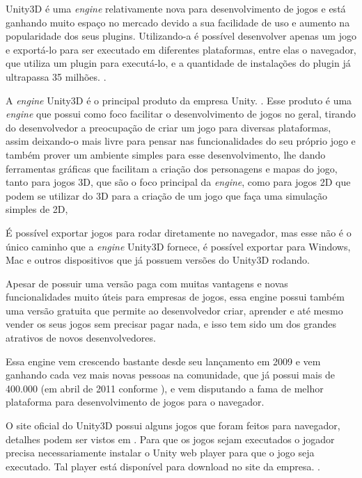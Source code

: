 Unity3D é uma \textit{engine} relativamente nova para desenvolvimento de jogos e está
ganhando muito espaço no mercado devido a sua facilidade de uso e
aumento na popularidade dos seus plugins. Utilizando-a é possível
desenvolver apenas um jogo e exportá-lo para ser executado em
diferentes plataformas, entre elas o navegador, que utiliza um
plugin para executá-lo, e a quantidade de instalações do plugin já
ultrapassa 35 milhões. \cite{blackman2011beginning}.

A \textit{engine} Unity3D é o principal produto da empresa
Unity. \cite{website:unity3dcompany}. Esse produto é uma \textit{engine}
que possui como foco facilitar o desenvolvimento de jogos no
geral, tirando do desenvolvedor a preocupação de criar um jogo para
diversas plataformas, assim deixando-o mais livre para pensar nas
funcionalidades do seu próprio jogo e também prover um ambiente
simples para esse desenvolvimento, lhe dando ferramentas gráficas que
facilitam a criação dos personagens e mapas do jogo, tanto para jogos
3D, que são o foco principal da \textit{engine}, como para jogos 2D
que podem se utilizar do 3D para a criação de um jogo que faça uma
simulação simples de 2D,

É possível exportar jogos para rodar diretamente no navegador, mas
esse não é o único caminho que a \textit{engine} Unity3D fornece, é possível exportar
para Windows, Mac e outros dispositivos que já possuem versões do
Unity3D rodando.

Apesar de possuir uma versão paga com muitas vantagens e novas
funcionalidades muito úteis para empresas de jogos, essa engine possui
também uma versão gratuita que permite ao desenvolvedor criar,
aprender e até mesmo vender os seus jogos sem precisar pagar nada, e
isso tem sido um dos grandes atrativos de novos desenvolvedores.

Essa engine vem crescendo bastante desde seu lançamento em 2009 e vem ganhando
cada vez mais novas pessoas na comunidade, que já possui mais de
400.000 (em abril de 2011 conforme
), e vem disputando a fama de melhor plataforma
para desenvolvimento de jogos para o navegador.

O site oficial do Unity3D possui alguns jogos que foram feitos para
navegador, detalhes podem ser vistos em .
Para que os jogos sejam executados o jogador precisa
necessariamente instalar o Unity web player para que o jogo seja executado.
Tal player está disponível para download no site da empresa. \cite{website:unity3dwebplayer}.


